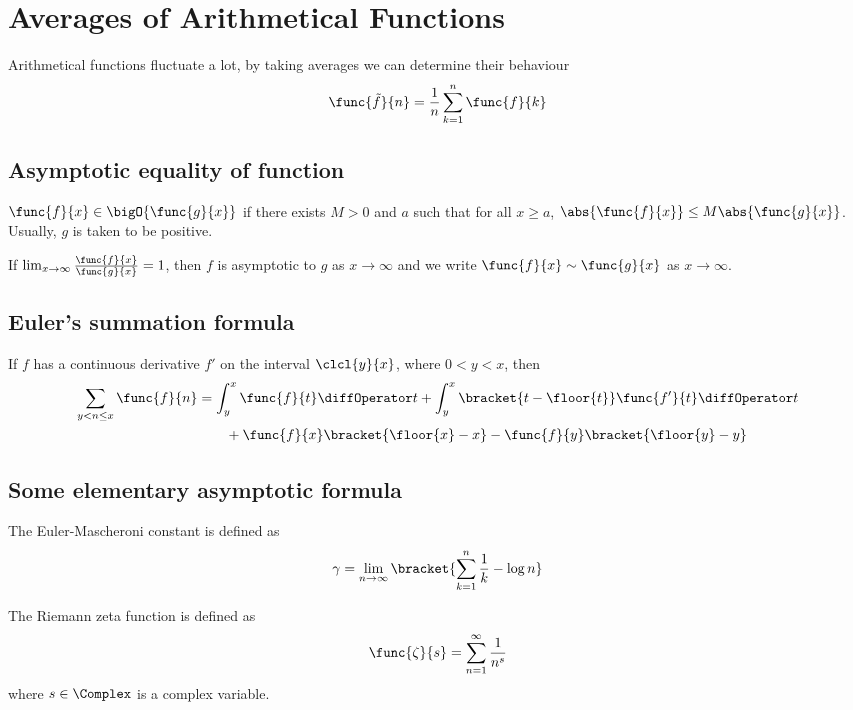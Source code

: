 \chapter{Averages of Arithmetical Functions}
Arithmetical functions fluctuate a lot, by taking averages we can determine their behaviour
\begin{equation*}
    \func{\tilde{f}}{n} = \frac{1}{n} \sum_{k = 1}^n \func{f}{k}
\end{equation*}
\section{Asymptotic equality of function}
\(\func{f}{x} \in \bigO{\func{g}{x}}\) if there exists \(M > 0\) and \(a\) such that for all \(x \geq a\), \(\abs{\func{f}{x}} \leq M \abs{\func{g}{x}}\). Usually, \(g\) is taken to be positive.
\begin{definition}
    If \(\lim_{x \to \infty } \frac{\func{f}{x}}{\func{g}{x}} = 1\), then \(f\) is asymptotic to \(g\) as \(x \to \infty\) and we write \(\func{f}{x} \sim \func{g}{x}\) as \(x \to \infty\).
\end{definition}
\section{Euler's summation formula}

\begin{theorem}
    If \(f\) has a continuous derivative \(f'\) on the interval \(\clcl{y}{x}\), where \(0 < y < x\), then 
    \begin{align*}
        \sum_{y < n \leq x} \func{f}{n} &= \int_{y}^x \func{f}{t} \diffOperator t + \int_y^x \bracket{t - \floor{t}} \func{f'}{t} \diffOperator t\\
        & \qquad + \func{f}{x} \bracket{\floor{x} - x} - \func{f}{y} \bracket{\floor{y} - y}
    \end{align*}
\end{theorem}

\section{Some elementary asymptotic formula}
\begin{definition}
    The Euler-Mascheroni constant is defined as 
    \begin{equation*}
        \gamma = \lim_{n \to \infty} \bracket{\sum_{k = 1}^n \dfrac{1}{k} - \log n}
    \end{equation*}
\end{definition}
\begin{definition}
    The Riemann zeta function is defined as 
    \begin{equation*}
        \func{\zeta}{s} = \sum_{n = 1}^{\infty} \dfrac{1}{n^s}
    \end{equation*}
    where \(s \in \Complex\) is a complex variable.
\end{definition}

